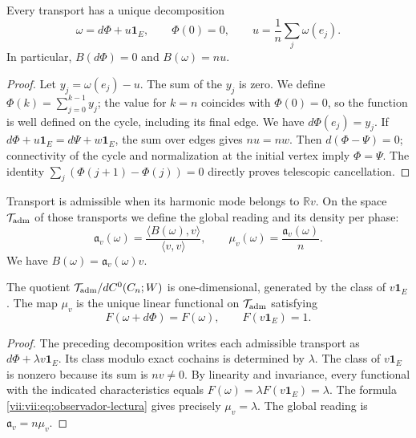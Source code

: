 \begin{theorem}
\label{vii:vii:thm:observador-descomposicion}
Every transport has a unique decomposition
\[
 \omega=d\Phi+u\mathbf1_E,\qquad \Phi(0)=0,
 \qquad u=\frac1n\sum_j\omega(e_j).
\]
In particular, \(B(d\Phi)=0\) and \(B(\omega)=nu\).
\end{theorem}

\begin{proof}
Let \(y_j=\omega(e_j)-u\). The sum of the \(y_j\) is zero.
We define \(\Phi(k)=\sum_{j=0}^{k-1}y_j\); the value for \(k=n\)
coincides with \(\Phi(0)=0\), so the function is well defined
on the cycle, including its final edge. We have \(d\Phi(e_j)=y_j\).
If \(d\Phi+u\mathbf1_E=d\Psi+w\mathbf1_E\), the sum over edges gives
\(nu=nw\). Then \(d(\Phi-\Psi)=0\); connectivity of the cycle
and normalization at the initial vertex imply \(\Phi=\Psi\).
The identity \(\sum_j(\Phi(j+1)-\Phi(j))=0\) directly proves
telescopic cancellation.
\end{proof}

\begin{definition}
\label{vii:vii:def:observador-admisible}
Transport is admissible when its harmonic mode belongs to
\(\mathbb Rv\). On the space \(\mathcal T_{\rm adm}\) of those
transports we define the global reading and its density per phase:
\begin{equation}
 \mathfrak a_v(\omega)
 =\frac{\langle B(\omega),v\rangle}{\langle v,v\rangle},
 \qquad
 \mu_v(\omega)=\frac{\mathfrak a_v(\omega)}n.
 \label{vii:vii:eq:observador-lectura}
\end{equation}
We have \(B(\omega)=\mathfrak a_v(\omega)v\).
\end{definition}

\begin{theorem}
\label{vii:vii:thm:observador-unicidad}
The quotient
\(\mathcal T_{\rm adm}/dC^0(C_n;W)\) is one-dimensional, generated
by the class of \(v\mathbf1_E\). The map \(\mu_v\) is the
unique linear functional on \(\mathcal T_{\rm adm}\) satisfying
\[
 F(\omega+d\Phi)=F(\omega),\qquad F(v\mathbf1_E)=1.
\]
\end{theorem}

\begin{proof}
The preceding decomposition writes each admissible transport as
\(d\Phi+\lambda v\mathbf1_E\). Its class modulo exact cochains
is determined by \(\lambda\). The class of \(v\mathbf1_E\)
is nonzero because its sum is \(nv\neq0\). By linearity and
invariance, every functional with the indicated characteristics equals
\(F(\omega)=\lambda F(v\mathbf1_E)=\lambda\). The formula
\eqref{vii:vii:eq:observador-lectura} gives precisely \(\mu_v=\lambda\).
The global reading is \(\mathfrak a_v=n\mu_v\).
\end{proof}

